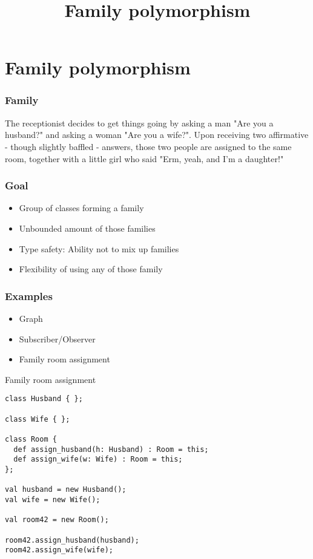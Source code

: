 \documentclass{beamer}
\title{Family polymorphism}
\begin{document}
\begin{frame}
\titlepage
\end{frame}


\section{Family polymorphism}

\begin{frame}
  \frametitle{Family}
\begin{displayquote}
The receptionist decides to get things going by asking a man "Are you a husband?" and asking a woman "Are you a wife?". Upon receiving two affirmative - though slightly baffled - answers, those two people are assigned to the same room, together with a little girl who said "Erm, yeah, and I'm a daughter!"
\end{displayquote}
\end{frame}

\begin{frame}
  \frametitle{Goal}
  \begin{itemize}
    \item Group of classes forming a family
    \item Unbounded amount of those families
    \item Type safety: Ability not to mix up families
    \item Flexibility of using any of those family
  \end{itemize}
\end{frame}

\begin{frame}
  \frametitle{Examples}
  \begin{itemize}
    \item Graph
    \item Subscriber/Observer
    \item Family room assignment
  \end{itemize}
\end{frame}

\begin{frame}
\centering
Family room assignment
\end{frame}

\begin{frame}[fragile]{}
\begin{verbatim}
class Husband { };

class Wife { };

class Room {
  def assign_husband(h: Husband) : Room = this;
  def assign_wife(w: Wife) : Room = this;
};

val husband = new Husband();
val wife = new Wife();

val room42 = new Room();

room42.assign_husband(husband);
room42.assign_wife(wife);
\end{verbatim}
\end{frame}
\end{document}
